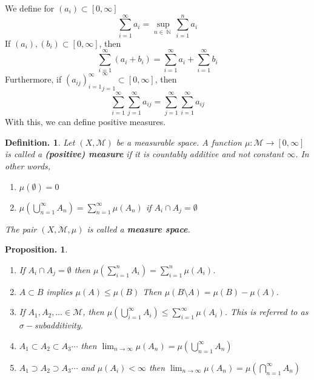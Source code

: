 \documentclass[11pt, a4paper]{memoir}
\DeclareMathOperator{\N}{{\mathbb{N}}}
\theoremstyle{change}
\newtheorem{proposition}[theorem]{Proposition.}
\theoremstyle{plain}
\theoremstyle{nonumberplain}
\newtheorem{definition}{Definition.}
\numberwithin{equation}{section}
\begin{document}
We define for $(a_i)\subset[0,\infty]$
\begin{equation*}
    \sum\limits_{i=1}^\infty a_i=\sup_{n\in\N}\sum\limits_{i=1}^n a_i
\end{equation*}
If $(a_i),(b_i)\subset[0,\infty]$, then
\begin{equation*}
    \sum\limits_{i=1}^\infty(a_i+b_i)=\sum\limits_{i=1}^\infty a_i+\sum\limits_{i=1}^\infty b_i
\end{equation*}
Furthermore, if ${(a_{ij})_{i=1}^\infty}_{j=1}^\infty\subset[0,\infty]$, then
\begin{equation*}
    \sum\limits_{i=1}^\infty\sum\limits_{j=1}^\infty a_{ij}=\sum\limits_{j=1}^\infty\sum\limits_{i=1}^\infty a_{ij}
\end{equation*}
With this, we can define positive measures.
\begin{definition}
    Let $(X,\mathcal{M})$ be a measurable space.
    A function $\mu:\mathcal{M}\to[0,\infty]$ is called a \textbf{(positive) measure} if it is countably additive and not constant $\infty$.
    In other words,
    \begin{enumerate}[nolistsep]
        \item $\mu(\emptyset)=0$
        \item $\mu\left(\bigcup\limits_{n=1}^\infty A_n\right)=\sum\limits_{n=1}^\infty \mu(A_n)$ if $A_i\cap A_j=\emptyset$
    \end{enumerate}
    The pair $(X,\mathcal{M},\mu)$ is called a \textbf{measure space}.
\end{definition}
\begin{proposition}
    \begin{enumerate}[nolistsep]
        \item If $A_i\cap A_j=\emptyset$ then $\mu\left(\sum_{i=1}^n A_i\right)=\sum_{i=1}^n\mu(A_i)$.
        \item $A\subset B$ implies $\mu(A)\leq\mu(B)$
            Then $\mu(B\setminus A)=\mu(B)-\mu(A)$.
        \item If $A_1,A_2,\ldots\in\mathcal{M}$, then $\mu\left(\bigcup_{i=1}^\infty A_i\right)\leq\sum_{i=1}^\infty \mu(A_i)$.
            This is referred to as $\sigma-$subadditivity.
        \item $A_1\subset A_2\subset A_3\cdots$ then $\lim_{n\to\infty}\mu(A_n)=\mu\left(\bigcup_{n=1}^\infty A_n\right)$
        \item $A_1\supset A_2\supset A_3\cdots$ and $\mu(A_i)<\infty$ then $\lim_{n\to\infty}\mu(A_n)=\mu\left(\bigcap_{n=1}^\infty A_n\right)$
    \end{enumerate}
\end{proposition}
\end{document}
